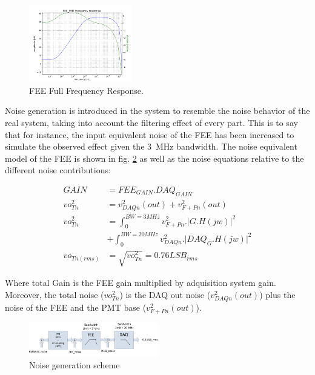 \documentclass[a4paper, 10pt, oneside, twocolumn, 3p]{elsarticle}
\begin{document}
\begin{figure}
	\begin{center}
		\includegraphics[width=0.4\textwidth]{./figures/FEEfull_freq.png}
		\caption{FEE Full Frequency Response.}
		\label{fig:Full_Freq}
	\end{center}
\end{figure}


Noise generation is introduced in the system to resemble the noise behavior of the real system, taking into account the filtering effect of every part. This is to say that for instance, the input equivalent noise of the FEE has been increased to simulate the observed effect given the 3~MHz bandwidth. The noise equivalent model of the FEE is shown in fig. \ref{fig:noise_eq} as well as the noise equations relative to the different noise contributions:

\begin{align}  
GAIN &= FEE_{GAIN}.DAQ_{GAIN} \\ 
vo_{Tn}^{2} &= v_{DAQn}^{2}(out) + v_{F+Pn}^{2}(out) \\
vo_{Tn}^{2} &= \int_{0}^{BW=3MHz}{v_{F+Pn}^{2}.{\lvert}G.H(jw){\rvert}^2}  \\
& + \int_{0}^{BW=20MHz}{v_{DAQn}^{2}.{\lvert}DAQ_{G}.H(jw){\rvert}^2}\\  
vo_{Tn(rms)} &= \sqrt{vo_{Tn}^{2}} = 0.76LSB_{rms}
\end{align}


Where total Gain is the FEE gain multiplied by adquisition system gain. Moreover, the total noise ($vo_{Tn}^{2}$) is the DAQ out noise ($v_{DAQn}^{2}(out)$) plus the noise of the FEE and the PMT base ($v_{F+Pn}^{2}(out)$).

\begin{figure}
	\begin{center}
		\includegraphics[width=0.5\textwidth]{./figures/NOISE.png}
		\caption{Noise generation scheme}
		\label{fig:noise_eq}
	\end{center}
\end{figure}
\end{document}

